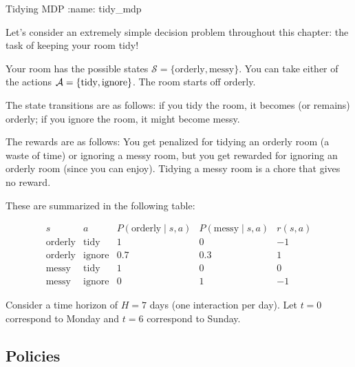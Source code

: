 \documentclass[\main/main]{subfiles}
\begin{document}
\begin{example}{Tidying MDP}
:name: tidy_mdp

    Let's consider an extremely simple decision problem throughout this chapter: the task of keeping your room tidy!

    Your room has the possible states $\mathcal{S} = \{ \text{orderly}, \text{messy} \}$. You can take either of the actions $\mathcal{A} = \{ \text{tidy}, \text{ignore} \}$. The room starts off orderly.
    
    The state transitions are as follows: if you tidy the room, it becomes (or remains) orderly; if you ignore the room, it might become messy.
    
    The rewards are as follows: You get penalized for tidying an orderly room (a waste of time) or ignoring a messy room, but you get rewarded for ignoring an orderly room (since you can enjoy). Tidying a messy room is a chore that gives no reward.
    
    These are summarized in the following table:

    \[
    \begin{array}{ccccc}
        s & a & P(\text{orderly} \mid s, a) & P(\text{messy} \mid s, a) & r(s, a) \\
        \text{orderly} & \text{tidy} & 1 & 0 & -1 \\
        \text{orderly} & \text{ignore} & 0.7 & 0.3 & 1 \\
        \text{messy} & \text{tidy} & 1 & 0 & 0 \\
        \text{messy} & \text{ignore} & 0 & 1 & -1
    \end{array}
    \]

    Consider a time horizon of $H = 7$ days (one interaction per day). Let $t = 0$ correspond to Monday and $t = 6$ correspond to Sunday.
\end{example}

\subsection{Policies}
\end{document}
